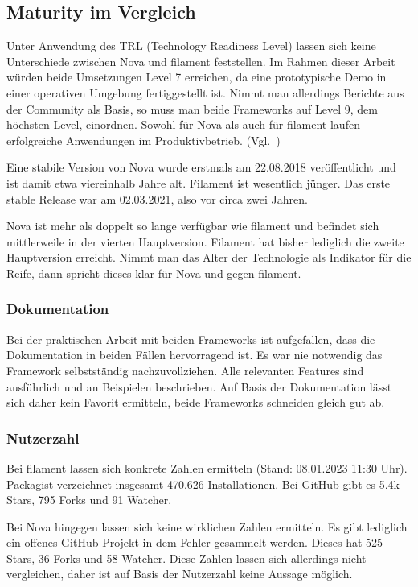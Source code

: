 \subsection{Maturity im Vergleich}
Unter Anwendung des TRL (Technology Readiness Level) lassen sich keine Unterschiede zwischen Nova und filament feststellen.
Im Rahmen dieser Arbeit würden beide Umsetzungen Level 7 erreichen, da eine prototypische Demo in einer operativen Umgebung fertiggestellt ist.
Nimmt man allerdings Berichte aus der Community als Basis, so muss man beide Frameworks auf Level 9, dem höchsten Level, einordnen.
Sowohl für Nova als auch für filament laufen erfolgreiche Anwendungen im Produktivbetrieb.
(Vgl.~\cite{technology-readiness})

Eine stabile Version von Nova wurde erstmals am 22.08.2018\cite{nova-releases} veröffentlicht und ist damit etwa viereinhalb Jahre alt.
Filament ist wesentlich jünger.
Das erste stable Release war am 02.03.2021\cite{filament-releases}, also vor circa zwei Jahren.

Nova ist mehr als doppelt so lange verfügbar wie filament und befindet sich mittlerweile in der vierten Hauptversion\cite{nova-releases}.
Filament hat bisher lediglich die zweite Hauptversion\cite{filament-releases} erreicht.
Nimmt man das Alter der Technologie als Indikator für die Reife, dann spricht dieses klar für Nova und gegen filament.

\subsubsection{Dokumentation}
Bei der praktischen Arbeit mit beiden Frameworks ist aufgefallen, dass die Dokumentation in beiden Fällen hervorragend ist.
Es war nie notwendig das Framework selbstständig nachzuvollziehen.
Alle relevanten Features sind ausführlich und an Beispielen beschrieben.
Auf Basis der Dokumentation lässt sich daher kein Favorit ermitteln, beide Frameworks schneiden gleich gut ab.

\subsubsection{Nutzerzahl}
Bei filament lassen sich konkrete Zahlen ermitteln (Stand: 08.01.2023 11:30 Uhr).
Packagist verzeichnet insgesamt 470.626 Installationen.
Bei GitHub gibt es 5.4k Stars, 795 Forks und 91 Watcher.

Bei Nova hingegen lassen sich keine wirklichen Zahlen ermitteln.
Es gibt lediglich ein offenes GitHub Projekt in dem Fehler gesammelt werden.
Dieses hat 525 Stars, 36 Forks und 58 Watcher.
Diese Zahlen lassen sich allerdings nicht vergleichen, daher ist auf Basis der Nutzerzahl keine Aussage möglich.

